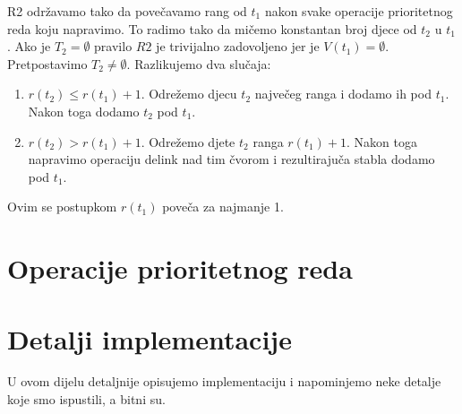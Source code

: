 R2 odr\v{z}avamo tako da pove\v{c}avamo rang od $t_{1}$ nakon svake operacije prioritetnog reda koju napravimo.
To radimo tako da mi\v{c}emo konstantan broj djece od $t_{2}$ u $t_{1}$.
Ako je $T_{2} = \emptyset$ pravilo $R2$ je trivijalno zadovoljeno jer je $V(t_{1}) = \emptyset$.
Pretpostavimo $T_{2} \ne \emptyset$.
Razlikujemo dva slu\v{c}aja:
\begin{enumerate}
  \item $r(t_{2}) \le r(t_{1}) + 1$.
        Odre\v{z}emo djecu $t_{2}$ najve\v{c}eg ranga i dodamo ih pod $t_{1}$.
        Nakon toga dodamo $t_{2}$ pod $t_{1}$.
  \item $r(t_{2}) > r(t_{1}) + 1$.
        Odre\v{z}emo djete $t_{2}$ ranga $r(t_{1}) + 1$.
        Nakon toga napravimo operaciju delink nad tim \v{c}vorom i rezultiraju\v{c}a stabla dodamo pod $t_{1}$.
\end{enumerate}
Ovim se postupkom $r(t_{1})$ pove\v{c}a za najmanje 1.

\section{Operacije prioritetnog reda}\label{impl}

\section{Detalji implementacije}\label{detalji_impl}

U ovom dijelu detaljnije opisujemo implementaciju i napominjemo neke detalje koje smo ispustili, a bitni su.
